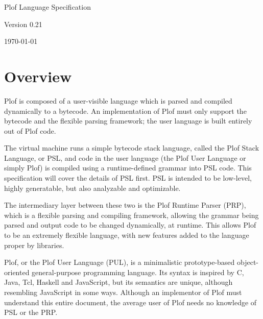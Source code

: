 \setlength{\pdfpageheight}{\paperheight}
\setlength{\pdfpagewidth}{\paperwidth}



\ifdefined\specdocheader
    \specdocheader
\else\fi

\begin{titlepage}
\begin{center}

\Huge{\textsf{Plof Language Specification}}

\Large{\textsf{Version 0.21}}

\large{\today}

\end{center}
\end{titlepage}

\tableofcontents

\part{Overview}

Plof is composed of a user-visible language which is parsed and compiled dynamically to a bytecode. An implementation of Plof must only support the bytecode and the flexible parsing framework; the user language is built entirely out of Plof code.

The virtual machine runs a simple bytecode stack language, called the Plof Stack Language, or PSL, and code in the user language (the Plof User Language or simply Plof) is compiled using a runtime-defined grammar into PSL code. This specification will cover the details of PSL first. PSL is intended to be low-level, highly generatable, but also analyzable and optimizable.

The intermediary layer between these two is the Plof Runtime Parser (PRP), which is a flexible parsing and compiling framework, allowing the grammar being parsed and output code to be changed dynamically, at runtime. This allows Plof to be an extremely flexible language, with new features added to the language proper by libraries.

Plof, or the Plof User Language (PUL), is a minimalistic prototype-based object-oriented general-purpose programming language. Its syntax is inspired by C, Java, Tcl, Haskell and JavaScript, but its semantics are unique, although resembling JavaScript in some ways. Although an implementor of Plof must understand this entire document, the average user of Plof needs no knowledge of PSL or the PRP.



